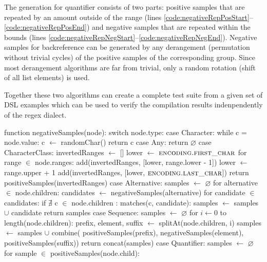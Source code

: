 The generation for quantifier consists of two parts: positive samples that are repeated by an amount outside of the range (lines \ref{code:negativeRepPosStart}--\ref{code:negativeRepPosEnd}) and negative samples that are repeated within the bounds (lines \ref{code:negativeRepNegStart}--\ref{code:negativeRepNegEnd}).
Negative samples for backreference can be generated by any derangement (permutation without trivial cycles) of the positive samples of the corresponding group. Since most derangement algorithms are far from trivial, only a random rotation (shift of all list elements) is used.

Together these two algorithms can create a complete test suite from a given set of DSL examples which can be used to verify the compilation results indenpendently of the regex dialect.

\begin{pseudoCode}[title={Generating Negative Test Samples},breakable=true,label=code:verificationNegative]
function negativeSamples(node):
  switch node.type:
    case Character: %
      while c = node.value:
        c $\gets$ randomChar()
      return c
    case Any:
      return $\varnothing$ %
    case CharacterClass: %
      invertedRanges $\gets$ []
      lower $\gets$ $\textsc{encoding.first\_char}$ 
      for range $\in$ node.ranges:
        add(invertedRanges, [lower, range.lower - 1])
        lower $\gets$ range.upper + 1
      add(invertedRanges, [lower, $\textsc{encoding.last\_char}$])
      return positiveSamples(invertedRanges) %
    case Alternative: %
      samples $\gets$ $\varnothing$
      for alternative $\in$ node.children:
        candidates $\gets$ negativeSamples(alternative)
        for candidate $\in$ candidates:
          if $\nexists$ c $\in$ node.children : matches(c, candidate):
            samples $\gets$ samples $\cup$ candidate
      return samples %
    case Sequence:
      samples $\gets$ $\varnothing$ 
      for $i \gets 0$ to length(node.children):
        prefix, element, suffix $\gets$ splitAt(node.children, i)
        samples $\gets$ samples $\cup$ combine(
                              positiveSamples(prefix), 
                              negativeSamples(element), 
                              positiveSamples(suffix))
      return concat(samples)
    case Quantifier:
      samples $\gets$ $\varnothing$ 
      for sample $\in$ positiveSamples(node.child): %

\end{pseudoCode}

